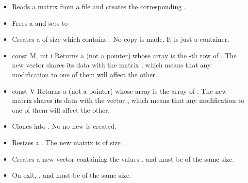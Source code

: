 \begin{itemize}
\item {}
  \sshortdescribe Reads a matrix from a file and creates the corresponding .  

\item {}
  \sshortdescribe Frees a  and sets  to  
\item {}
    \sshortdescribe Creates a  of size  
    which contains . No copy is made. It is just a container.
\item {}
  {const  \ptr M, int i}
  \sshortdescribe Returns a  (not a pointer) whose array is
  the -th row of . The new vector shares its data with the
  matrix , which means that any modification to one of them will affect
  the other.
  
\item {}
  {const  \ptr V}
  \sshortdescribe Returns a  (not a pointer) whose array is
  the array of . The new matrix shares its data with the
  vector , which means that any modification to one of them will affect
  the other.


\item {}
  \sshortdescribe Clones  into . No no new
   is created.

\item {}
  \sshortdescribe Resizes a . The new matrix is of size
  .  
\item {}
  \sshortdescribe Creates a new vector containing the values .  and  must be of the same size.

\item {}
  \sshortdescribe On exit, .  and
   must be of the same size.
\end{itemize}  



